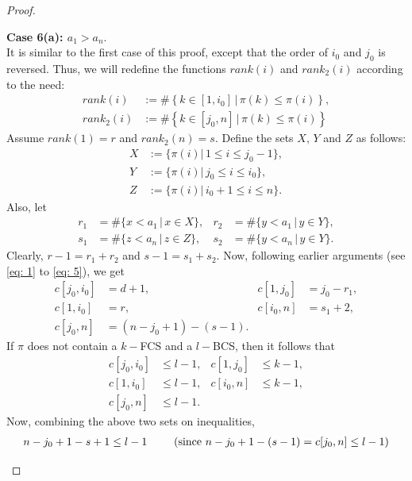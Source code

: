 \documentclass[11pt, a4paper]{article}
\theoremstyle{compact}
\begin{document}
\begin{proof}
\begin{enumerate}
    \textbf{Case 6(a): $a_1>a_n$}. \\
    It is similar to the first case of this proof, except that the order of $i_0$ and $j_0$ is reversed. Thus, we will redefine the functions $rank(i)$ and $rank_2(i)$ according to the need:
    \begin{align*}
        rank(i) & := \#  \left\{ k \in [1,i_0]\, \big| \, \pi(k) \leq \pi(i)  \right\},  \\
         rank_2(i) & := \#  \left\{ k \in [j_0,n]\, \big| \, \pi(k) \leq \pi(i)  \right\} 
    \end{align*}
    Assume $rank(1) = r$ and $rank_2(n) = s$. Define the sets $X, \, Y$ and $Z$ as follows:
    \begin{align*}
        X & :=\{ \pi(i) \vert \, 1\leq i \leq j_0-1 \}, \\
        Y & := \{ \pi(i) \vert \, j_0\leq i \leq i_0 \}, \\
        Z & := \{ \pi(i) \vert \, i_0+ 1\leq i \leq n \}.
    \end{align*}
    Also, let
    \begin{align*}
        r_1 &  = \#\{ x < a_1 \, \vert \, x \in X \}, &
        r_2 & = \#\{ y < a_1 \, \vert \, y \in Y \} ,\\
        s_1 & = \#\{ z < a_n \, \vert \, z \in Z \}, &
        s_2  &  = \#\{ y < a_n \, \vert \, y \in Y \}.
    \end{align*}
    Clearly, $r-1 = r_1 + r_2$ and $s-1 = s_1+s_2$. Now, following earlier arguments (see \ref{eq: 1} to \ref{eq: 5}), we get  
    \begin{align*}
        c[j_0, i_0] & = d + 1  ,    &        c[1, j_0] & = j_0 - r_1, \\
         c[1, i_0] &  = r , &         c[i_0,n] & = s_1 + 2, \\
         c[j_0, n] & = (n-j_0+1) - (s-1).
    \end{align*}
    If $\pi$ does not contain a $k-$FCS and a $l-$BCS, then it follows that
    \begin{align*}
        c[j_0, i_0] & \leq l-1, & c[1, j_0] & \leq k-1, \\
        c[1, i_0] & \leq l-1, &  c[i_0, n] & \leq k -1, \\
        c[j_0, n] & \leq l-1.
    \end{align*}
    Now, combining the above two sets on inequalities,
    \begin{align*}
       & n-j_0+1 - s + 1  \leq l-1 \hspace{5mm} & (\text{since } n-j_0+ 1-(s-1) = c[j_0, n] \leq l-1) \\

\end{align*}
\end{enumerate}
\end{proof}
\end{document}
